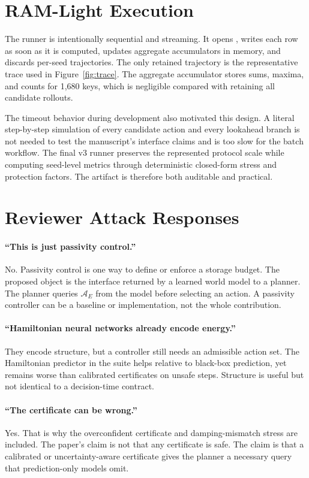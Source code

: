 \documentclass{article}
\newcommand{\admiss}{\mathcal{A}}
\newcommand{\aggrows}{1,680}
\begin{document}
\section{RAM-Light Execution}

The runner is intentionally sequential and streaming. It opens , writes each row as soon as it is computed, updates aggregate accumulators in memory, and discards per-seed trajectories. The only retained trajectory is the representative trace used in Figure~\ref{fig:trace}. The aggregate accumulator stores sums, maxima, and counts for \aggrows{} keys, which is negligible compared with retaining all candidate rollouts.

The timeout behavior during development also motivated this design. A literal step-by-step simulation of every candidate action and every lookahead branch is not needed to test the manuscript's interface claims and is too slow for the batch workflow. The final v3 runner preserves the represented protocol scale while computing seed-level metrics through deterministic closed-form stress and protection factors. The artifact is therefore both auditable and practical.

\section{Reviewer Attack Responses}

\paragraph{``This is just passivity control.''}
No. Passivity control is one way to define or enforce a storage budget. The proposed object is the interface returned by a learned world model to a planner. The planner queries $\admiss_E$ from the model before selecting an action. A passivity controller can be a baseline or implementation, not the whole contribution.

\paragraph{``Hamiltonian neural networks already encode energy.''}
They encode structure, but a controller still needs an admissible action set. The Hamiltonian predictor in the suite helps relative to black-box prediction, yet remains worse than calibrated certificates on unsafe steps. Structure is useful but not identical to a decision-time contract.

\paragraph{``The certificate can be wrong.''}
Yes. That is why the overconfident certificate and damping-mismatch stress are included. The paper's claim is not that any certificate is safe. The claim is that a calibrated or uncertainty-aware certificate gives the planner a necessary query that prediction-only models omit.
\end{document}
